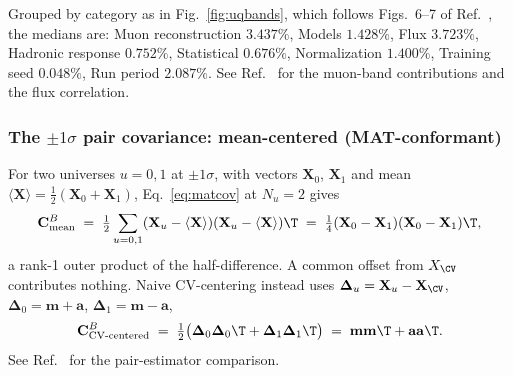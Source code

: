 Grouped by category as in Fig.~\ref{fig:uqbands}, which follows Figs.~6--7 of Ref.~\cite{MINERvA:2021owq}, the medians are: Muon reconstruction $3.437\%$, Models $1.428\%$, Flux $3.723\%$, Hadronic response $0.752\%$, Statistical $0.676\%$, Normalization $1.400\%$, Training seed $0.048\%$, Run period $2.087\%$. See Ref.~\cite{NoteRecords2026} for the muon-band contributions and the flux correlation. 

\subsubsection{The $\pm 1\sigma$ pair covariance: mean-centered (MAT-conformant)}
\label{app:pair}

For two universes $u=0,1$ at $\pm 1\sigma$, with vectors $\mathbf{X}_{0}$, $\mathbf{X}_{1}$ and mean $\langle\mathbf{X}\rangle = \tfrac12(\mathbf{X}_{0}+\mathbf{X}_{1})$, Eq.~\eqref{eq:matcov} at $N_{u}=2$ gives
\begin{equation}
\mathbf{C}^{B}_{\text{mean}}
\;=\;
\tfrac12\sum_{u=0,1}(\mathbf{X}_{u}-\langle\mathbf{X}\rangle)(\mathbf{X}_{u}-\langle\mathbf{X}\rangle)\T
\;=\;
\tfrac14(\mathbf{X}_{0}-\mathbf{X}_{1})(\mathbf{X}_{0}-\mathbf{X}_{1})\T,
\end{equation}
a rank-1 outer product of the half-difference. A common offset from $X_{\CV}$ contributes nothing. Naive CV-centering instead uses $\boldsymbol{\Delta}_{u} = \mathbf{X}_{u}-\mathbf{X}_{\CV}$, $\boldsymbol{\Delta}_{0}=\mathbf{m}+\mathbf{a}$, $\boldsymbol{\Delta}_{1}=\mathbf{m}-\mathbf{a}$,
\begin{equation}
\mathbf{C}^{B}_{\text{CV-centered}}
\;=\;
\tfrac{1}{2}\big(\boldsymbol{\Delta}_{0}\boldsymbol{\Delta}_{0}\T
                + \boldsymbol{\Delta}_{1}\boldsymbol{\Delta}_{1}\T\big)
\;=\;
\mathbf{m}\mathbf{m}\T + \mathbf{a}\mathbf{a}\T.
\end{equation}
See Ref.~\cite{NoteRecords2026} for the pair-estimator comparison.

